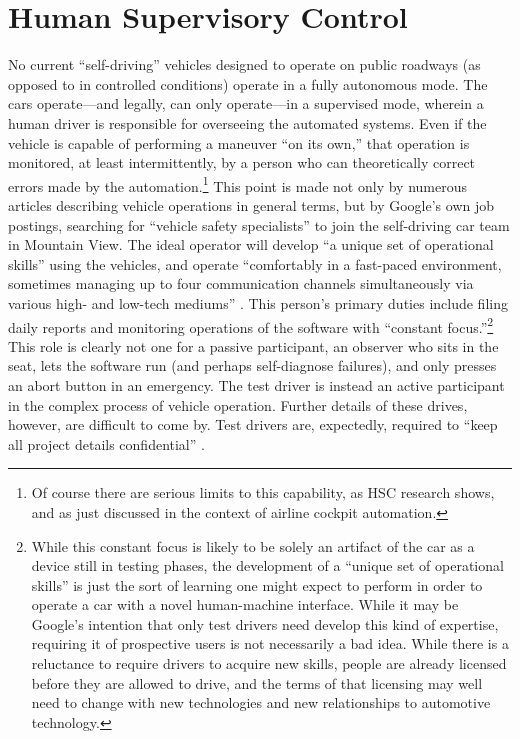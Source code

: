 \section{Human Supervisory Control}

No current ``self-driving'' vehicles designed to operate on public
roadways (as opposed to in controlled conditions) operate in a fully
autonomous mode. The cars operate---and legally, can only
operate---in
a supervised mode, wherein a human driver is responsible for
overseeing the automated systems. Even if the vehicle is capable of
performing a maneuver ``on its own,'' that operation is monitored, at
least intermittently, by a person who can theoretically correct errors
made by the automation.\footnote{Of course there are serious
  limits to this capability, as HSC research shows, and as just discussed
  in the context of airline cockpit automation.} This point is made not
only by numerous articles describing vehicle operations in general terms,
but by Google's
own job postings, searching for ``vehicle safety specialists'' to join
the self-driving car team in Mountain View. The ideal operator will
develop ``a unique set of operational skills'' using the vehicles, and
operate ``comfortably in a fast-paced environment, sometimes managing
up to four communication channels simultaneously via various high- and
low-tech mediums'' \cite{googleJobPosting}. This person's primary
duties include filing daily reports and monitoring operations of the
software with ``constant focus.''\footnote{While this constant focus
  is likely to be solely an artifact of the car as a device still in
  testing phases, the development of a ``unique set of operational
  skills'' is just the sort of learning one might expect to perform in
order to operate a car with a novel human-machine interface. While it
may be Google's intention that only test drivers need develop this
kind of expertise, requiring it of prospective users is not
necessarily a bad idea. While there is a reluctance to require drivers
to acquire new skills, people are already licensed before they are
allowed to drive, and the terms of that licensing may well need to
change with new technologies and new relationships to automotive
technology.} This role is clearly not one for a passive participant,
an observer who sits in the seat, lets the software run (and perhaps
self-diagnose failures), and only presses an abort button in an
emergency. The test driver is instead an active participant in the
complex process of 
vehicle operation. Further details of these drives, however,
are difficult to come by. Test drivers are, expectedly, required to
``keep all project details confidential'' \cite{googleJobPosting}.

